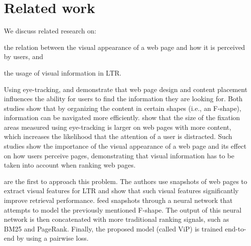 
\section{Related work}
\label{sec:relatedwork}

We discuss related research on:
\begin{inparaenum}[(i)]
\item the relation between the visual appearance of a web page and how it is perceived by users, and
\item the usage of visual information in \ac{LTR}.
\end{inparaenum} 


Using eye-tracking, \citet{nielsen2006f} and \citet{pernice2017f} demonstrate that web page design and content placement influences the ability for users to find the information they are looking for. 
Both studies show that by organizing the content in certain shapes (i.e., an F-shape), information can be  navigated more efficiently.
\citet{wang2014eye} show that the size of the fixation areas measured using eye-tracking is larger on web pages with more content, which increases the likelihood that the attention of a user is distracted.
Such studies show the importance of the visual appearance of a web page and its effect on how users perceive pages, demonstrating that visual information has to be taken into account when ranking web pages.

\citet{fan2017learning} are the first to approach this problem.
The authors use snapshots of web pages to extract visual features for LTR
and show that such visual features significantly improve retrieval performance.
\citet{fan2017learning} feed snapshots through a neural network that attempts to model the previously mentioned F-shape.
The output of this neural network is then concatenated with more traditional ranking signals, such as BM25 and PageRank.
Finally, the proposed model (called ViP) is trained end-to-end by using a pairwise loss.

